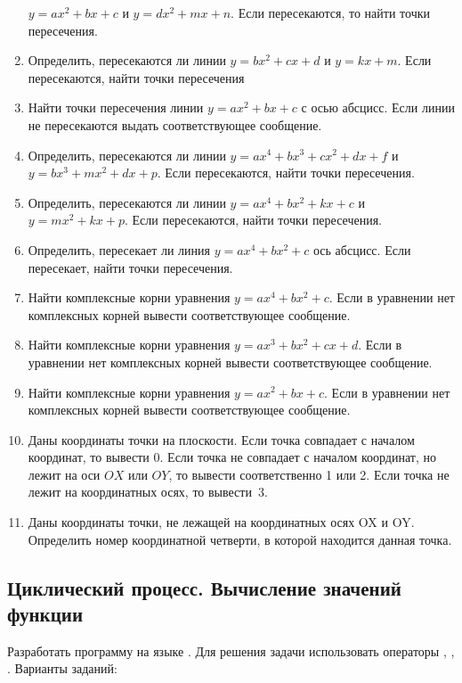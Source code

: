 \begin{enumerate}
$y=ax^2+bx+c$ и $y=dx^2+mx+n$. Если
пересекаются, то найти точки пересечения.
\item Определить, пересекаются ли линии
$y=bx^2+cx+d$ и
$y=kx+m$. Если пересекаются, найти точки пересечения
\item Найти точки пересечения линии
$y=ax^2+bx+c$ с осью
абсцисс. Если линии не пересекаются выдать соответствующее сообщение.
\item Определить, пересекаются ли линии
$y=ax^4+bx^3+cx^2+dx+f$
и
$y=bx^3+mx^2+dx+p$.
Если пересекаются, найти точки пересечения.
\item Определить, пересекаются ли линии
$y=ax^4+bx^2+kx+c$
и
$y=mx^2+kx+p$.
Если пересекаются, найти точки пересечения.
\item Определить, пересекает ли линия
$y=ax^4+bx^2+c$
ось абсцисс. Если пересекает, найти точки пересечения.
\item Найти комплексные корни уравнения
$y=ax^4+bx^2+c$.
Если в уравнении нет комплексных корней вывести соответствующее сообщение.
\item Найти комплексные корни уравнения
$y=ax^3+bx^2+cx+d$. Если в
уравнении нет комплексных корней вывести соответствующее сообщение.
\item Найти комплексные корни уравнения $y=ax^2+bx+c$. Если в
уравнении нет комплексных корней вывести соответствующее сообщение.
\item Даны координаты точки на плоскости. Если точка совпадает с началом координат, то вывести 0. Если точка не
совпадает с началом координат, но лежит на оси $OX$ или $OY$, то вывести соответственно 1 или 2. Если точка не лежит на
координатных осях, то вывести~3.
\item Даны координаты точки, не лежащей на координатных осях OX и OY. Определить номер координатной четверти, в которой
находится данная точка.
\end{enumerate}

\subsection[Циклический процесс. Вычисление значений функции]{Циклический процесс. Вычисление значений функции}

Разработать программу на языке . Для решения задачи использовать операторы ,
, . Варианты заданий:

